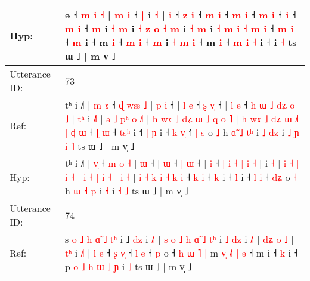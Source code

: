 \documentclass[10pt]{article}
\DeclareRobustCommand{\hl}[1]{{\textcolor{red}{#1}}}
\begin{document}
\begin{longtable}{ll}
 \\
Hyp: & ə ˧\hl{}\hl{}\hl{}\hl{}\hl{}\hl{} \hl{}\hl{m} \hl{i} \hl{˧} | \hl{}\hl{m} \hl{}\hl{i} ˧ \hl{|} i \hl{˧} |\hl{}\hl{} \hl{}\hl{i} ˧\hl{}\hl{} \hl{z} \hl{i} ˧ \hl{m} \hl{}\hl{i} ˧\hl{}\hl{} \hl{m} \hl{i} ˧\hl{}\hl{} \hl{m} \hl{}\hl{i} ˧\hl{}\hl{} \hl{}\hl{i} ˧\hl{}\hl{} \hl{m} \hl{i} ˧ \hl{m} i \hl{˧} \hl{m} i \hl{˧} \hl{z} \hl{o} \hl{˧} \hl{m} i\hl{}\hl{} \hl{˧} \hl{}\hl{m} i \hl{}\hl{˧} \hl{m} \hl{i} \hl{˧} \hl{m} \hl{i} ˧ \hl{m} \hl{i} ˧\hl{}\hl{} \hl{m} i ˧ m \hl{i} ˧ \hl{}\hl{m} \hl{i} ˧ \hl{m} i\hl{}\hl{} \hl{˧} \hl{m} \hl{i} ˧\hl{}\hl{} m \hl{i} ˧\hl{}\hl{}\hl{}\hl{}\hl{} \hl{m} \hl{i} \hl{˧} i ˧\hl{}\hl{} i \hl{˧} ts ɯ ˩ | m v̩ ˩
 \\
\midrule
Utterance ID: & 73 \\
Ref: & tʰ i ˩˥ | \hl{m}\hl{ }\hl{ɤ} ˧ \hl{ɖ} \hl{w}\hl{æ} \hl{˩} |\hl{ }\hl{p} \hl{i} ˧ |\hl{ }\hl{l} \hl{e} ˧ \hl{ʂ} \hl{v}\hl{̩} ˧ |\hl{ }\hl{l} \hl{e} ˧ \hl{h} \hl{ɯ} \hl{˩} \hl{d}\hl{ʑ} \hl{o} \hl{˩} |\hl{ }\hl{t}\hl{ʰ} i \hl{˩}\hl{˥} | \hl{ə} \hl{˩} \hl{p}\hl{ʰ} \hl{o} \hl{˩}\hl{˥} |\hl{ }\hl{h} \hl{w}\hl{ɤ} \hl{˩} \hl{d}\hl{ʑ} \hl{ɯ} \hl{˩} \hl{q} \hl{o} \hl{˥} |\hl{ }\hl{h}\hl{ }\hl{w}\hl{ɤ} \hl{˩} \hl{d}\hl{ʑ} \hl{ɯ} \hl{˩}\hl{˥} \hl{|} \hl{ɖ} \hl{ɯ} ˧ \hl{ɭ} \hl{ɯ} ˧ \hl{t}\hl{s}\hl{ʰ} i ˧\hl{˥}\hl{ }\hl{|} \hl{ɲ} i ˧ \hl{k} \hl{v}\hl{̩} ˧\hl{˥} \hl{|}\hl{ }\hl{s} o \hl{˩} h \hl{ɑ}\hl{̃} \hl{˩} \hl{t}\hl{ʰ} i\hl{ }\hl{˩} \hl{d}\hl{z} i\hl{ }\hl{˩}\hl{ }\hl{ɲ} \hl{i} \hl{˥} ts ɯ ˩ | m v̩ ˩
 \\
Hyp: & tʰ i ˩˥ | \hl{}\hl{v}\hl{̩} ˧ \hl{m} \hl{}\hl{o} \hl{˧} |\hl{}\hl{} \hl{ɯ} ˧ |\hl{}\hl{} \hl{ɯ} ˧ \hl{|} \hl{}\hl{ɯ} ˧ |\hl{}\hl{} \hl{i} ˧ \hl{|} \hl{i} \hl{˧} \hl{}\hl{|} \hl{i} \hl{˧} |\hl{}\hl{}\hl{} i \hl{}\hl{˧} | \hl{i} \hl{˧} \hl{}\hl{|} \hl{i} \hl{}\hl{˧} |\hl{}\hl{} \hl{}\hl{i} \hl{˧} \hl{}\hl{|} \hl{i} \hl{˧} \hl{|} \hl{i} \hl{˧} |\hl{}\hl{}\hl{}\hl{}\hl{} \hl{i} \hl{}\hl{˧} \hl{k} \hl{}\hl{i} \hl{˧} \hl{k} \hl{i} ˧ \hl{k} \hl{i} ˧ \hl{}\hl{}\hl{k} i ˧\hl{}\hl{}\hl{} \hl{l} i ˧ \hl{l} \hl{}\hl{i} ˧\hl{} \hl{}\hl{d}\hl{ʑ} o \hl{˧} h \hl{}\hl{ɯ} \hl{˧} \hl{}\hl{p} i\hl{}\hl{} \hl{}\hl{˧} i\hl{}\hl{}\hl{}\hl{} \hl{˧} \hl{˩} ts ɯ ˩ | m v̩ ˩
 \\
\midrule
Utterance ID: & 74 \\
Ref: & s\hl{ }\hl{o}\hl{ }\hl{˩}\hl{ }\hl{h} \hl{ɑ}\hl{̃} \hl{˩} \hl{t}\hl{ʰ} i ˩ \hl{d}\hl{z} i \hl{˩}\hl{˥} |\hl{ }\hl{s}\hl{ }\hl{o}\hl{ }\hl{˩}\hl{ }\hl{h} \hl{ɑ}\hl{̃} \hl{˩} \hl{t}\hl{ʰ} i \hl{˩} \hl{d}\hl{z} i \hl{˩}\hl{˥} |\hl{ }\hl{d}\hl{ʑ} \hl{o} \hl{˩} |\hl{ }\hl{t}\hl{ʰ} i \hl{˩}\hl{˥} |\hl{ }\hl{l} \hl{e} ˧ \hl{ʂ} \hl{v}\hl{̩} ˧ \hl{l} \hl{e} ˧ \hl{p} o ˧ \hl{h}\hl{ }\hl{ɯ} \hl{˥} \hl{|} m\hl{ }\hl{v}\hl{̩}\hl{ }\hl{˩}\hl{˥}\hl{ }\hl{|} \hl{ə} ˧ m i ˧ \hl{k} i ˧ p\hl{ }\hl{o} \hl{˩} \hl{h} \hl{ɯ} \hl{˩} \hl{ɲ} i \hl{˩} ts ɯ ˩ | m v̩ ˩

\end{longtable}
\end{document}
